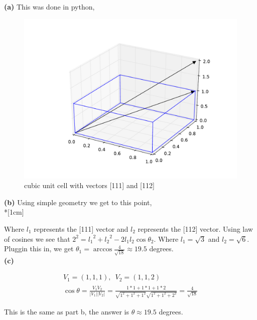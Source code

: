 \documentclass[12pt]{article}
\begin{document}
\textbf{(a)} This was done in python,

\begin{figure}[H]
\centering
\includegraphics[width=400pt]{graph_p3_27.pdf}
\caption{cubic unit cell with vectors [111] and [112]}
\end{figure}

\textbf{(b)} Using simple geometry we get to this point, \\*[1cm]
\begin{figure}[H]
\centering
{}
\end{figure}

Where $l_1$ represents the [111] vector and $l_2$ represents the [112] vector. Using law of cosines we see that $2^2 = {l_1}^2 + {l_2}^2 - 2l_1l_2\cos{\theta_2}$. Where $l_1 = \sqrt{3}$ and $l_2 = \sqrt{6}$. Pluggin this in, we get $\theta_1 = \arccos{\frac{4}{\sqrt{18}}} \approx 19.5$ degrees. \\

\textbf{(c)} 

\begin{align*}
V_1 = (1,1,1) ,\,\,\, V_2 = (1,1,2) \\
\cos{\theta} = \frac{V_1 \dot V_2}{|V_1||V_2|} = \frac{1*1 + 1*1 + 1*2}{\sqrt{1^2 + 1^2 + 1^2}\sqrt{1^2 + 1^2 + 2^2}} = \frac{4}{\sqrt{18}}
\end{align*}

This is the same as part b, the answer is $\theta \approx 19.5$ degrees.








 
\end{document}
